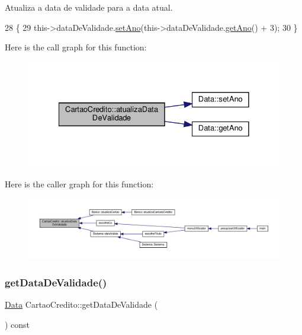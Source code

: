 Atualiza a data de validade para a data atual. 


\begin{DoxyCode}
28 \{
29     this->dataDeValidade.\hyperlink{classData_a8d4cfad647b590df436d8260000a2745}{setAno}(this->dataDeValidade.\hyperlink{classData_ae19e0d5af87f94f2809ba52dae69e15b}{getAno}() + 3);
30 \}
\end{DoxyCode}
Here is the call graph for this function\+:
\nopagebreak
\begin{figure}[H]
\begin{center}
\leavevmode
\includegraphics[width=328pt]{classCartaoCredito_a52daaab859e37d416c00044ef0fb2f27_cgraph}
\end{center}
\end{figure}
Here is the caller graph for this function\+:
\nopagebreak
\begin{figure}[H]
\begin{center}
\leavevmode
\includegraphics[width=350pt]{classCartaoCredito_a52daaab859e37d416c00044ef0fb2f27_icgraph}
\end{center}
\end{figure}
\mbox{\label{classCartaoCredito_ab28b73bbecc20b5c23348e1172230533}} 
\subsubsection{\texorpdfstring{get\+Data\+De\+Validade()}{getDataDeValidade()}}
{\footnotesize\ttfamily \hyperlink{classData}{Data} Cartao\+Credito\+::get\+Data\+De\+Validade (\begin{DoxyParamCaption}{ }\end{DoxyParamCaption}) const}



